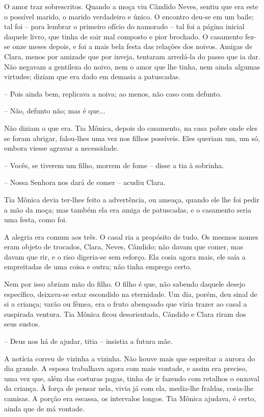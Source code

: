 O amor traz sobrescritos. Quando a moça viu Cândido Neves, sentiu que
era este o possível marido, o marido verdadeiro e único. O encontro
deu-se em um baile; tal foi -- para lembrar o primeiro ofício do
namorado -- tal foi a página inicial daquele livro, que tinha de sair
mal composto e pior brochado. O casamento fez-se onze meses depois, e
foi a mais bela festa das relações dos noivos. Amigas de Clara, menos
por amizade que por inveja, tentaram arredá-la do passo que ia dar. Não
negavam a gentileza do noivo, nem o amor que lhe tinha, nem ainda
algumas virtudes; diziam que era dado em demasia a patuscadas.

-- Pois ainda bem, replicava a noiva; ao menos, não caso com defunto.

-- Não, defunto não; mas é que...

Não diziam o que era. Tia Mônica, depois do casamento, na casa pobre
onde eles se foram abrigar, falou-lhes uma vez nos filhos possíveis.
Eles queriam um, um só, embora viesse agravar a necessidade.

-- Vocês, se tiverem um filho, morrem de fome -- disse a tia à sobrinha.

-- Nossa Senhora nos dará de comer -- acudiu Clara.

Tia Mônica devia ter-lhes feito a advertência, ou ameaça, quando ele lhe
foi pedir a mão da moça; mas também ela era amiga de patuscadas, e o
casamento seria uma festa, como foi.

A alegria era comum aos três. O casal ria a propósito de tudo. Os mesmos
nomes eram objeto de trocados, Clara, Neves, Cândido; não davam que
comer, mas davam que rir, e o riso digeria-se sem esforço. Ela cosia
agora mais, ele saía a empreitadas de uma coisa e outra; não tinha
emprego certo.

Nem por isso abriam mão do filho. O filho é que, não sabendo daquele
desejo específico, deixava-se estar escondido na eternidade. Um dia,
porém, deu sinal de si a criança; varão ou fêmea, era o fruto abençoado
que viria trazer ao casal a suspirada ventura. Tia Mônica ficou
desorientada, Cândido e Clara riram dos seus sustos.

-- Deus nos há de ajudar, titia -- insistia a futura mãe.

A notícia correu de vizinha a vizinha. Não houve mais que espreitar a
aurora do dia grande. A esposa trabalhava agora com mais vontade, e
assim era preciso, uma vez que, além das costuras pagas, tinha de ir
fazendo com retalhos o enxoval da criança. À força de pensar nela, vivia
já com ela, media-lhe fraldas, cosia-lhe camisas. A porção era escassa,
os intervalos longos. Tia Mônica ajudava, é certo, ainda que de má
vontade.

